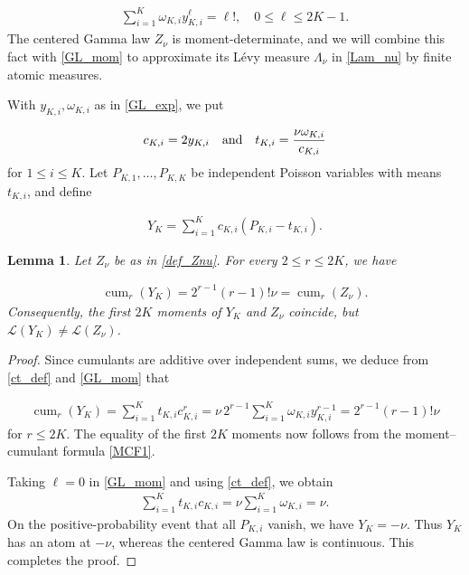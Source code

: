 \documentclass[letterpaper,11pt,reqno]{amsart}
\numberwithin{equation}{section}
\theoremstyle{plain}
\newtheorem{lemma}[theorem]{Lemma}
\theoremstyle{definition}
\theoremstyle{remark}
\newcommand{\cL}{\mathcal{L}}
\DeclareMathOperator{\cum}{cum}
\newcommand{\noi}{\noindent}
\newcommand{\AND}{\quad{\rm and}\quad}
\begin{document}
\noi
\begin{align}
 \sum_{i=1}^K\omega_{K,i}y_{K,i}^\ell
 =\ell!,
 \quad 0\leq\ell\leq2K-1.
 \label{GL_mom}
\end{align}
The centered Gamma law $Z_\nu$ is moment-determinate,
and we will
combine this fact with \eqref{GL_mom} to approximate its L\'evy measure $\Lambda_\nu$ in \eqref{Lam_nu}
 by finite atomic measures.


With $y_{K,i},\omega_{K,i}$ as in \eqref{GL_exp}, we put


\noi
\begin{align}
 c_{K,i} =2y_{K,i}
\AND
 t_{K,i} =\frac{\nu\omega_{K,i}}{c_{K,i}}
 \label{ct_def}
\end{align}
for $1\leq i\leq K$.
Let $P_{K,1},\ldots,P_{K,K}$ be independent Poisson variables with
means $t_{K,i}$, and define

\noi
\begin{align}\label{def_YK}
 Y_K=\sum_{i=1}^Kc_{K,i}
 (P_{K,i}-t_{K,i}).
\end{align}

\begin{lemma}
\label{lem_YK}
Let $Z_\nu$ be as in \eqref{def_Znu}.
For every $2\leq r\leq2K$, we have


\noi
\begin{align*}
 \cum_r(Y_K)
 =2^{r-1}(r-1)!\nu
 =\cum_r(Z_\nu).
\end{align*}
Consequently, the first $2K$ moments of $Y_K$ and $Z_\nu$
coincide, but $\cL(Y_K)\neq\cL(Z_\nu)$.

\end{lemma}

\begin{proof}
Since cumulants are additive over independent sums, we deduce from
\eqref{ct_def} and \eqref{GL_mom} that

\noi
\begin{align}\label{CUMR}
 \cum_r(Y_K)
 =\sum_{i=1}^Kt_{K,i}c_{K,i}^r
 =\nu\,2^{r-1}\sum_{i=1}^K\omega_{K,i}y_{K,i}^{r-1}
 =2^{r-1}(r-1)!\nu
\end{align}
for $r\leq2K$.
The equality of the first $2K$ moments now follows from the
moment--cumulant formula \eqref{MCF1}.

Taking $\ell=0$ in \eqref{GL_mom} and using \eqref{ct_def}, we obtain
\noi
\begin{align*}
 \sum_{i=1}^Kt_{K,i}c_{K,i}
 =\nu\sum_{i=1}^K\omega_{K,i}=\nu.
\end{align*}
On the positive-probability event that all $P_{K,i}$ vanish, we have
$Y_K=-\nu$.  Thus $Y_K$ has an atom at $-\nu$, whereas the centered
Gamma law is continuous.  This completes the proof.
\end{proof}
\end{document}
